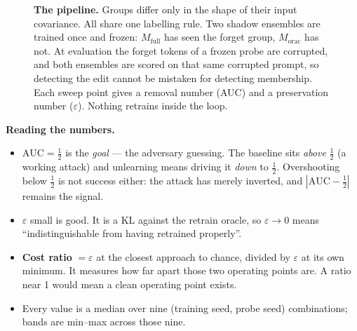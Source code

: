 \documentclass[11pt,a4paper]{article}
\begin{document}
\begin{figure}[H]
\caption{\textbf{The pipeline.} Groups differ only in the shape of their input
covariance. All share one labelling rule. Two shadow ensembles are trained once
and frozen: $M_{\mathrm{full}}$ has seen the forget group, $M_{\mathrm{orac}}$
has not. At evaluation the forget tokens of a frozen probe are corrupted, and
both ensembles are scored on that same corrupted prompt, so detecting the edit
cannot be mistaken for detecting membership. Each sweep point gives a removal
number (AUC) and a preservation number ($\varepsilon$). Nothing retrains inside
the loop.}
\label{fig:pipeline}
\end{figure}

\vspace{-4pt}
\begin{mdframed}[linewidth=0.6pt,linecolor=black!45,backgroundcolor=black!2,
  innertopmargin=6pt,innerbottommargin=6pt,innerleftmargin=8pt,innerrightmargin=8pt]
\small
\textbf{Reading the numbers.}
\begin{itemize}\setlength{\itemsep}{1pt}\setlength{\parskip}{0pt}\setlength{\topsep}{2pt}
\item $\mathrm{AUC}=\tfrac12$ is the \emph{goal} --- the adversary guessing.
The baseline sits \emph{above} $\tfrac12$ (a working attack) and unlearning
means driving it \emph{down} to $\tfrac12$. Overshooting below $\tfrac12$ is
not success either: the attack has merely inverted, and
$|\mathrm{AUC}-\tfrac12|$ remains the signal.
\item $\varepsilon$ small is good. It is a KL against the retrain oracle, so
$\varepsilon\!\to\!0$ means ``indistinguishable from having retrained properly''.
\item \textbf{Cost ratio} $=\varepsilon$ at the closest approach to chance,
divided by $\varepsilon$ at its own minimum. It measures how far apart those
two operating points are. A ratio near 1 would mean a clean operating point
exists.
\item Every value is a median over nine (training seed, probe seed)
combinations; bands are min--max across those nine.
\end{itemize}
\end{mdframed}
\end{document}
